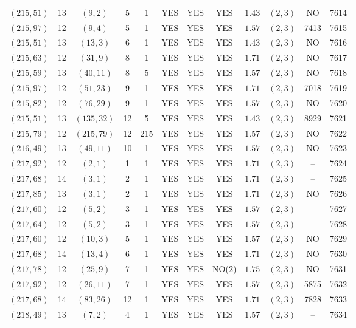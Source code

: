 \begin{longtable}{|c|c|c|c|c|c|c|c|c|c|c|c|}
$(215,51)$ & 13 & $(9,2)$ & 5 & 1 & YES & YES & YES & $1.43$ & $(2,3)$ & NO & 7614\\
$(215,97)$ & 12 & $(9,4)$ & 5 & 1 & YES & YES & YES & $1.57$ & $(2,3)$ & 7413 & 7615\\
$(215,51)$ & 13 & $(13,3)$ & 6 & 1 & YES & YES & YES & $1.43$ & $(2,3)$ & NO & 7616\\
$(215,63)$ & 12 & $(31,9)$ & 8 & 1 & YES & YES & YES & $1.71$ & $(2,3)$ & NO & 7617\\
$(215,59)$ & 13 & $(40,11)$ & 8 & 5 & YES & YES & YES & $1.57$ & $(2,3)$ & NO & 7618\\
$(215,97)$ & 12 & $(51,23)$ & 9 & 1 & YES & YES & YES & $1.71$ & $(2,3)$ & 7018 & 7619\\
$(215,82)$ & 12 & $(76,29)$ & 9 & 1 & YES & YES & YES & $1.57$ & $(2,3)$ & NO & 7620\\
$(215,51)$ & 13 & $(135,32)$ & 12 & 5 & YES & YES & YES & $1.43$ & $(2,3)$ & 8929 & 7621\\
$(215,79)$ & 12 & $(215,79)$ & 12 & 215 & YES & YES & YES & $1.57$ & $(2,3)$ & NO & 7622\\
$(216,49)$ & 13 & $(49,11)$ & 10 & 1 & YES & YES & YES & $1.57$ & $(2,3)$ & NO & 7623\\
$(217,92)$ & 12 & $(2,1)$ & 1 & 1 & YES & YES & YES & $1.71$ & $(2,3)$ & -- & 7624\\
$(217,68)$ & 14 & $(3,1)$ & 2 & 1 & YES & YES & YES & $1.71$ & $(2,3)$ & -- & 7625\\
$(217,85)$ & 13 & $(3,1)$ & 2 & 1 & YES & YES & YES & $1.71$ & $(2,3)$ & NO & 7626\\
$(217,60)$ & 12 & $(5,2)$ & 3 & 1 & YES & YES & YES & $1.57$ & $(2,3)$ & -- & 7627\\
$(217,64)$ & 12 & $(5,2)$ & 3 & 1 & YES & YES & YES & $1.57$ & $(2,3)$ & -- & 7628\\
$(217,60)$ & 12 & $(10,3)$ & 5 & 1 & YES & YES & YES & $1.57$ & $(2,3)$ & NO & 7629\\
$(217,68)$ & 14 & $(13,4)$ & 6 & 1 & YES & YES & YES & $1.71$ & $(2,3)$ & NO & 7630\\
$(217,78)$ & 12 & $(25,9)$ & 7 & 1 & YES & YES & NO(2) & $1.75$ & $(2,3)$ & NO & 7631\\
$(217,92)$ & 12 & $(26,11)$ & 7 & 1 & YES & YES & YES & $1.57$ & $(2,3)$ & 5875 & 7632\\
$(217,68)$ & 14 & $(83,26)$ & 12 & 1 & YES & YES & YES & $1.71$ & $(2,3)$ & 7828 & 7633\\
$(218,49)$ & 13 & $(7,2)$ & 4 & 1 & YES & YES & YES & $1.57$ & $(2,3)$ & -- & 7634\\

\end{longtable}
